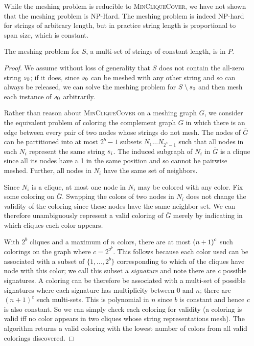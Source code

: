 While the meshing problem is reducible to {\textsc{MinCliqueCover}},
we have not shown that the meshing problem is NP-Hard.  The meshing
problem is indeed NP-hard for strings of arbitrary length, but in
practice string length is proportional to span size, which is
constant.

\begin{theorem}\label{thm:polytime}
The meshing problem for $S$, a multi-set of strings of constant length, is in $P$. %
\end{theorem}

\begin{proof}
We assume without loss of generality that $S$ does not contain the
all-zero string $s_0$; if it does, since $s_0$ can be meshed
with any other string and so can always be released, we can solve the
meshing problem for $S \setminus s_0$ and then mesh each instance
of $s_0$ arbitrarily.

Rather than reason about {\textsc{MinCliqueCover}} on a
 meshing graph $G$, we consider the equivalent
problem of coloring the complement graph $\bar{G}$ in which there is
an edge between every pair of two nodes whose strings do not mesh. The nodes of $\bar{G}$ can be partitioned into at most $2^b-1$
subsets $N_1 \ldots N_{2^b-1}$ such that all nodes in each
$N_i$ represent the same string $s_i$.  The induced subgraph of
$N_i$ in $\bar{G}$ is a clique since all its nodes have a 1 in the same position and so cannot be pairwise meshed.  Further, all nodes in $N_i$ have the same set of neighbors.

Since $N_i$ is a clique, at most one node in $N_i$ may be colored with
any color.  Fix some coloring on $\bar{G}$.  Swapping the colors of
two nodes in $N_i$ does not change the validity of the coloring since
these nodes have the same neighbor set.  We can therefore
unambiguously represent a valid coloring of $\bar{G}$ merely by
indicating in which cliques each color appears.

With $2^b$ cliques and a maximum of $n$ colors, there are at most $\left(
n+1 \right) ^{c}$ such colorings on the graph where $c=2^{2^b}$. This follows because each color used can be associated with a subset of $\{1, \ldots, 2^b\}$ corresponding to which of the cliques have node with this color; we call this subset a \emph{signature} and note there are $c$ possible signatures. A coloring can be therefore be associated with a multi-set of possible signatures where each signature has multiplicity between 0 and $n$; there are $(n+1)^c$ such multi-sets. This is polynomial in $n$ since $b$ is constant and hence $c$ is also constant. So we can simply check each coloring for validity (a coloring is valid iff no color appears in two cliques whose string representations mesh). The algorithm returns a valid coloring with the lowest number of colors from all valid colorings discovered.
\end{proof}

